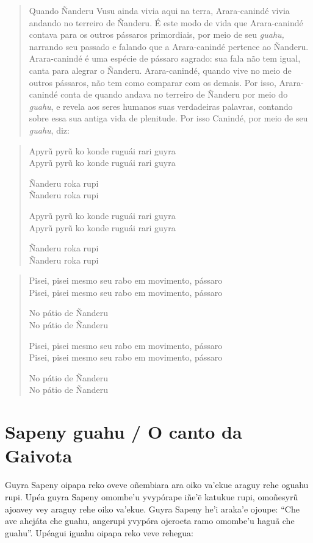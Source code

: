 \begin{itemize}
\begin{quote}
Quando Ñanderu Vusu ainda vivia aqui na terra, Arara-canindé vivia
andando no terreiro de Ñanderu. É este modo de vida que Arara-canindé
contava para os outros pássaros primordiais, por meio de seu
\emph{guahu,} narrando seu passado e falando que a Arara-canindé
pertence ao Ñanderu. Arara-canindé é uma espécie de pássaro sagrado: sua
fala não tem igual, canta para alegrar o Ñanderu. Arara-canindé, quando
vive no meio de outros pássaros, não tem como comparar com os demais.
Por isso, Arara-canindé conta de quando andava no terreiro de Ñanderu
por meio do \emph{guahu}, e revela aos seres humanos suas verdadeiras
palavras, contando sobre essa sua antiga vida de plenitude. Por isso
Canindé, por meio de seu \emph{guahu}, diz:
\end{quote}

\begin{verse}
Apyrũ pyrũ ko konde ruguái rari guyra\\
Apyrũ pyrũ ko konde ruguái rari guyra

Ñanderu roka rupi\\
Ñanderu roka rupi

Apyrũ pyrũ ko konde ruguái rari guyra\\
Apyrũ pyrũ ko konde ruguái rari guyra

Ñanderu roka rupi\\
Ñanderu roka rupi
\end{verse}

\begin{verse}
Pisei, pisei mesmo seu rabo em movimento, pássaro\\
Pisei, pisei mesmo seu rabo em movimento, pássaro

No pátio de Ñanderu\\
No pátio de Ñanderu

Pisei, pisei mesmo seu rabo em movimento, pássaro\\
Pisei, pisei mesmo seu rabo em movimento, pássaro

No pátio de Ñanderu\\
No pátio de Ñanderu
\end{verse}

\chapter{Sapeny guahu / O canto da Gaivota}

Guyra Sapeny oipapa reko oveve oñembiara ara oiko va'ekue araguy rehe
oguahu rupi. Upéa guyra Sapeny omombe'u yvypórape iñe'ẽ katukue rupi,
omoñesyrũ ajoavey vey araguy rehe oiko va'ekue. Guyra Sapeny he'i
araka'e ojoupe: ``Che ave ahejáta che guahu, angerupi yvypóra ojeroeta
ramo omombe'u haguã che guahu''. Upéagui iguahu oipapa reko veve
rehegua:


\end{itemize}
